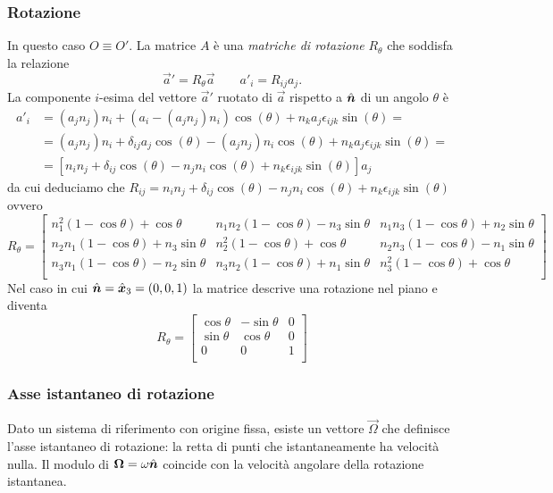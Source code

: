 \subsubsection{Rotazione}
In questo caso $ O \equiv O' $. La matrice $ A $ è una \emph{matriche di rotazione} $ R_\theta $ che soddisfa la relazione \[\vec a' = R_\theta \vec a \qquad a'_i = R_{ij} a_j.\] La componente $ i $-esima del vettore $ \vec a' $ ruotato di $ \vec a $ rispetto a $ \hat{\boldsymbol{n}} $ di un angolo $ \theta $ è 
\begin{align*}
a'_i & = (a_j n_j) n_i + (a_i - (a_j n_j)n_i) \cos(\theta) + n_k a_j \epsilon_{ijk} \sin(\theta) = \\
& = (a_j n_j) n_i + \delta_{ij} a_j \cos(\theta) - (a_j n_j)n_i \cos(\theta) + n_k a_j \epsilon_{ijk} \sin(\theta) = \\
& = [n_i n_j + \delta_{ij}\cos(\theta) - n_j n_i \cos(\theta) + n_k \epsilon_{ijk} \sin(\theta)] a_j
\end{align*}
da cui deduciamo che $ R_{ij} = n_i n_j + \delta_{ij}\cos(\theta) - n_j n_i \cos(\theta) + n_k \epsilon_{ijk} \sin(\theta) $ ovvero
\begin{equation}
R_\theta = 
\begin{bmatrix}
n_1^2 (1 - \cos \theta) + \cos \theta & n_1 n_2 (1 - \cos \theta) - n_3 \sin \theta & n_1 n_3 (1 - \cos \theta) + n_2 \sin \theta \\
n_2 n_1 (1 - \cos \theta) + n_3 \sin \theta & n_2^2 (1 - \cos \theta) + \cos \theta & n_2 n_3 (1 - \cos \theta) - n_1 \sin \theta \\
n_3 n_1 (1 - \cos \theta) - n_2 \sin \theta & n_3 n_2 (1 - \cos \theta) + n_1 \sin \theta & n_3^2 (1 - \cos \theta) + \cos \theta \\
\end{bmatrix}
\end{equation}
Nel caso in cui $ \hat{\boldsymbol{n}} = \hat{\boldsymbol{x}}_3 = (0, 0, 1) $ la matrice descrive una rotazione nel piano e diventa
\[R_\theta = 
\begin{bmatrix}
\cos \theta & - \sin \theta & 0 \\
\sin \theta & \cos \theta & 0 \\
0 & 0 & 1 \\
\end{bmatrix}\]

\subsubsection{Asse istantaneo di rotazione}
Dato un sistema di riferimento con origine fissa, esiste un vettore $ \vec \Omega $ che definisce l'asse istantaneo di rotazione: la retta di punti che istantaneamente ha velocità nulla. Il modulo di $ \boldsymbol{\Omega} = \omega \hat{\boldsymbol{n}} $ coincide con la velocità angolare della rotazione istantanea.

